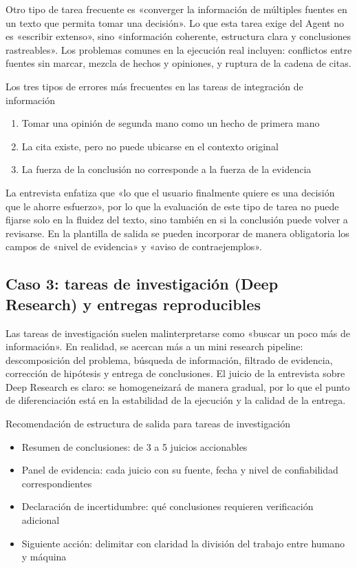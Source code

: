 \documentclass[a4paper]{article}
\begin{document}
Otro tipo de tarea frecuente es «converger la información de múltiples fuentes en un texto que permita tomar una decisión». Lo que esta tarea exige del Agent no es «escribir extenso», sino «información coherente, estructura clara y conclusiones rastreables». Los problemas comunes en la ejecución real incluyen: conflictos entre fuentes sin marcar, mezcla de hechos y opiniones, y ruptura de la cadena de citas.

\begin{warningbox}{Los tres tipos de errores más frecuentes en las tareas de integración de información}
\begin{enumerate}
    \item Tomar una opinión de segunda mano como un hecho de primera mano
    \item La cita existe, pero no puede ubicarse en el contexto original
    \item La fuerza de la conclusión no corresponde a la fuerza de la evidencia
\end{enumerate}
\end{warningbox}

La entrevista enfatiza que «lo que el usuario finalmente quiere es una decisión que le ahorre esfuerzo», por lo que la evaluación de este tipo de tarea no puede fijarse solo en la fluidez del texto, sino también en si la conclusión puede volver a revisarse. En la plantilla de salida se pueden incorporar de manera obligatoria los campos de «nivel de evidencia» y «aviso de contraejemplos».

\subsection{Caso 3: tareas de investigación (Deep Research) y entregas reproducibles}

Las tareas de investigación suelen malinterpretarse como «buscar un poco más de información». En realidad, se acercan más a un mini research pipeline: descomposición del problema, búsqueda de información, filtrado de evidencia, corrección de hipótesis y entrega de conclusiones. El juicio de la entrevista sobre Deep Research es claro: se homogeneizará de manera gradual, por lo que el punto de diferenciación está en la estabilidad de la ejecución y la calidad de la entrega.

\begin{knowledgebox}{Recomendación de estructura de salida para tareas de investigación}
\begin{itemize}
    \item Resumen de conclusiones: de 3 a 5 juicios accionables
    \item Panel de evidencia: cada juicio con su fuente, fecha y nivel de confiabilidad correspondientes
    \item Declaración de incertidumbre: qué conclusiones requieren verificación adicional
    \item Siguiente acción: delimitar con claridad la división del trabajo entre humano y máquina
\end{itemize}
\end{knowledgebox}
\end{document}
